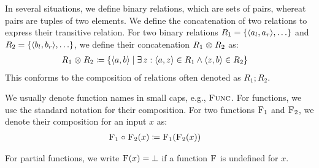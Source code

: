 In several situations, we define binary relations, which are sets of pairs, whereat pairs are tuples of two elements.
We define the concatenation of two relations to express their transitive relation.
For two binary relations $R_1 = \setted{\tupled{a_{l}, a_{r}}, \dots}$ and $R_2 = \setted{\tupled{b_{l}, b_{r}}, \dots}$, we define their concatenation $R_1 \mathrel{\otimes} R_2$ as:
\begin{align*}
    &
    R_1 \concat R_2 \equalsperdefinition \setted{\tupled{a,b} \mid \exists z : \tupled{a,z} \in R_1 \land \tupled{z,b} \in R_2}
\end{align*}
This conforms to the composition of relations often denoted as $R_1 ; R_2$.

We usually denote function names in small caps, e.g., $\textsc{Func}$.
For functions, we use the standard notation for their composition. For two functions $\textsc{F}_{1}$ and $\textsc{F}_{2}$, we denote their composition for an input $x$ as:
\begin{align*}
    &
    \textsc{F}_{1} \mathrel{\circ} \textsc{F}_{2}(x) \coloneqq \textsc{F}_{1}(\textsc{F}_{2}(x))
\end{align*}

For partial functions, we write $\textsc{F}(x) = \bot$ if a function $\textsc{F}$ is undefined for $x$.
